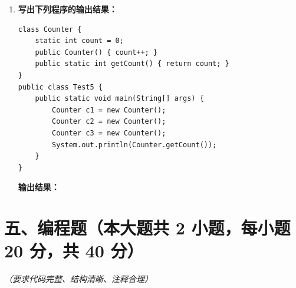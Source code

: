 \documentclass[a3paper, landscape, 11pt, twocolumn]{article}
\begin{document}
\begin{enumerate}[label=\arabic*., itemsep=1em]
	\item \textbf{写出下列程序的输出结果：}
	      \begin{lstlisting}[style=JavaExam]
class Counter {
    static int count = 0;
    public Counter() { count++; }
    public static int getCount() { return count; }
}
public class Test5 {
    public static void main(String[] args) {
        Counter c1 = new Counter();
        Counter c2 = new Counter();
        Counter c3 = new Counter();
        System.out.println(Counter.getCount());
    }
}
\end{lstlisting}
	      \textbf{输出结果：}\underline{\hspace{8cm}}
\end{enumerate}

\newpage
\section*{五、编程题（本大题共 2 小题，每小题 20 分，共 40 分）}
\textit{（要求代码完整、结构清晰、注释合理）}
\end{document}
